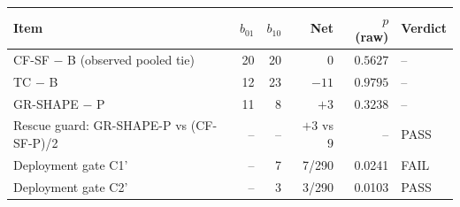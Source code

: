 \begin{tabular}{lrrrrl}
\toprule
Item & $b_{01}$ & $b_{10}$ & Net & $p$ (raw) & Verdict \\
\midrule
CF-SF $-$ B (observed pooled tie) & 20 & 20 & $0$ & $0.5627$ & -- \\
TC $-$ B & 12 & 23 & $-11$ & $0.9795$ & -- \\
GR-SHAPE $-$ P & 11 & 8 & $+3$ & $0.3238$ & -- \\
Rescue guard: GR-SHAPE-P vs (CF-SF-P)/2 & -- & -- & $+3$ vs $9$ & -- & PASS \\
Deployment gate C1' & -- & 7 & 7/290 & 0.0241 & FAIL \\
Deployment gate C2' & -- & 3 & 3/290 & 0.0103 & PASS \\
\bottomrule
\end{tabular}
